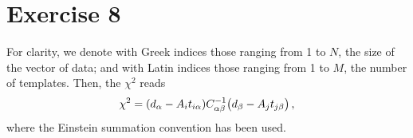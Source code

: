\documentclass[main.tex]{subfiles}
\begin{document}
\section*{Exercise 8}

For clarity, we denote with Greek indices those ranging from 1 to \(N\), the size of the vector of data; and with Latin indices those ranging from 1 to \(M\), the number of templates. 
Then, the \(\chi^2\) reads 
%
\begin{align}
\chi^2 = \qty(d_\alpha - A_{i} t_{i \alpha }) C^{-1}_{\alpha \beta } 
\qty(d_\beta - A_j t_{j \beta })
\,,
\end{align}
%
where the Einstein summation convention has been used. 
\end{document}

